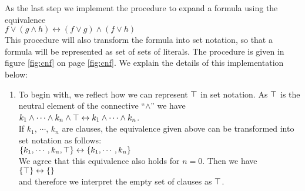 As the last step we implement the procedure to expand a formula using the equivalence
\\[0.2cm]
\hspace*{1.3cm}
$f \vee (g \wedge h) \leftrightarrow (f \vee g) \wedge (f \vee h)$
\\[0.2cm]
This procedure will also transform the formula into set notation, so that a formula will be 
represented as set of sets of literals.  The procedure is given in figure \ref{fig:cnf}
on page \ref{fig:cnf}.  We explain the details of this implementation below:
\begin{enumerate}
\item To begin with, we reflect how we can represent  $\top$ in set notation.
      As  $\top$ is the neutral element of the connective ``$\wedge$'' we have
      \\[0.2cm]
      \hspace*{1.3cm} 
      $k_1 \wedge \cdots \wedge k_n \wedge \top \leftrightarrow  k_1 \wedge \cdots \wedge k_n$.
      \\[0.2cm]
      If  $k_1$, $\cdots$, $k_n$ are clauses, the equivalence given above can be transformed into
      set notation as follows: \\[0.2cm]
      \hspace*{1.3cm} 
      $\{ k_1, \cdots, k_n, \top \} \leftrightarrow \{ k_1, \cdots, k_n \}$
      \\[0.2cm]
      We agree that this equivalence also holds for  $n = 0$.  Then we have
      \\[0.2cm]
      \hspace*{1.3cm} $\{\top \} \leftrightarrow \{\}$ \\[0.2cm]
      and therefore we interpret the empty set of clauses as $\top$.


\end{enumerate}
